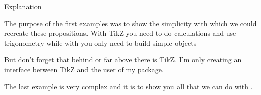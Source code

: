 %

Explanation

The purpose of the first  examples was to show the simplicity with which we could recreate these propositions. With TikZ you need to do calculations and use trigonometry while with  you only need to build simple objects

But don't forget that behind or far above  there is TikZ. I'm only creating an interface between TikZ and the user of my package.

The last example is very complex and it is to show you all that we can do with .


